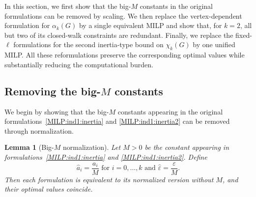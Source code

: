 \documentclass[10pt]{article}
\newtheorem{lemma}[theorem]{Lemma}
\begin{document}
In this section, we first show that the big-\(M\) constants in the original
formulations can be removed by scaling. We then replace the vertex-dependent
formulation for \(\alpha_k(G)\) by a single equivalent MILP and show that, for
\(k=2\), all but two of its closed-walk constraints are redundant. Finally, we
replace the fixed-\(\ell\) formulations for the second inertia-type bound on
\(\chi_k(G)\) by one unified MILP. All these reformulations preserve the
corresponding optimal values while substantially reducing the computational
burden.

\subsection{Removing the big-\(M\) constants}
\label{subsec:big-M-removal}

We begin by showing that the big-\(M\) constants appearing in the original
formulations~\eqref{MILP:ind1:inertia} and
\eqref{MILP:ind1:inertia2} can be removed through normalization.

\begin{lemma}[Big-\(M\) normalization]
\label{lem:big-M-normalization}
Let \(M>0\) be the constant appearing in
formulations~\eqref{MILP:ind1:inertia} and
\eqref{MILP:ind1:inertia2}. Define
\[
    \widehat{a}_i=\frac{a_i}{M}\text{ for } i=0,\ldots,k \text{ and } \widehat{\varepsilon}=\frac{\varepsilon}{M}.
\]
Then each formulation is
equivalent to its normalized version without \(M\), and their optimal
values coincide.
\end{lemma}
\end{document}
